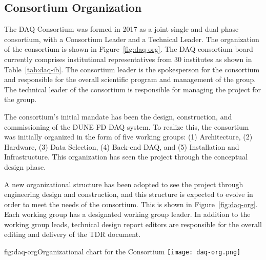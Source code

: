 \subsection{Consortium Organization}

The DAQ Consortium was formed in 2017 as a joint single and
dual phase consortium, with a Consortium Leader and a Technical
Leader. The organization of the consortium is shown in
Figure~\ref{fig:daq-org}. The DAQ consortium board currently comprises
institutional representatives from 30 institutes as shown in Table~\ref{tab:daq-ib}. The consortium leader is the spokesperson for the consortium and
responsible for the overall scientific program and management of the
group. The technical leader of the consortium is responsible for
managing the project for the group.

The consortium's initial mandate has been the design, construction,
and commissioning 
of the DUNE FD DAQ system. To realize this, the consortium was
initially organized in the form of five working groups: (1)
Architecture, (2) Hardware, (3) Data Selection, (4) Back-end DAQ, and (5)
Installation and Infrastructure. This organization has seen the
project through the conceptual design phase.  

A new organizational
structure has been adopted to see the project through engineering
design and construction, and this structure is expected to evolve in
order to meet the needs of the consortium. This is shown in Figure~\ref{fig:daq-org}. Each working group has a designated working group
leader. In addition to the
working group leads, technical design report editors are responsible for the
overall editing and delivery of the TDR document.

\begin{dunefigure}{fig:daq-org}{Organizational chart for the  Consortium
 }
  \texttt{[image: daq-org.png]}
\end{dunefigure}

